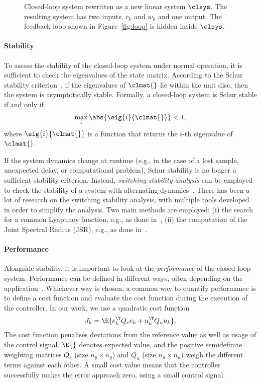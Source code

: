 \begin{figure}[t]
\centering

\caption{Closed-loop system rewritten as a new linear system $\clsys$.
    The resulting system has two inputs, $r_k$ and $w_k$ and one output.
    The feedback loop shown in Figure~\ref{fig:loop} is hidden inside $\clsys$.}
\label{fig:closedloop}
\end{figure}

\paragraph*{Stability}

To assess the stability of the closed-loop system under normal operation, it is sufficient to check the eigenvalues of the state matrix. 
According to the Schur stability criterion~\cite{Astrom:1997}, if the eigenvalues of $\clmat{}$ lie within the unit disc, then the system is asymptotically stable. 
Formally, a closed-loop system is Schur stable if and only if
%
\begin{equation}
    \label{eq:schur}
    \max_i{\abs{\eig{i}{\clmat{}}}} < 1,
\end{equation}
%
where $\eig{i}{\clmat{}}$ is a function that returns the $i$-th eigenvalue of~$\clmat{}$.

If the system dynamics change at runtime (e.g., in the case of a lost sample, unexpected delay, or computational problem), Schur stability is no longer a sufficient stability criterion.
Instead, \emph{switching stability analysis} can be employed to check the stability of a system with alternating dynamics~\cite{Jungers2009}.
There has been a lot of research on the switching stability analysis, with multiple tools developed in order to simplify the analysis.
Two main methods are employed: (i) the search for a common Lyapunov function, e.g., as done in~\cite{Linsenmayer:2017}, (ii) the computation of the Joint Spectral Radius (JSR), e.g., as done in~\cite{Maggio:2020,Jungers:2014}.

\paragraph*{Performance}

Alongside stability, it is important to look at the \emph{performance} of the closed-loop system.
Performance can be defined in different ways, often depending on the application~\cite{Astrom:2006}.
Whichever way is chosen, a common way to quantify performance is to define a cost function and evaluate the cost function during the execution of the controller.
In our work, we use a quadratic cost function
%
\begin{equation}
    \label{eq:cost}
    J_k = \E{e_k^\T Q_e e_k + u_k^\T Q_u u_k}.
\end{equation}
%
The cost function penalises deviations from the reference value as well as usage of the control signal.
$\E{}$ denotes expected value, and the positive semidefinite weighting matrices $Q_e$ (size $n_y \times n_y$) and $Q_u$ (size $n_u \times n_u$) weigh the different terms against each other.
A small cost value means that the controller successfully makes the error approach zero, using a small control signal.

